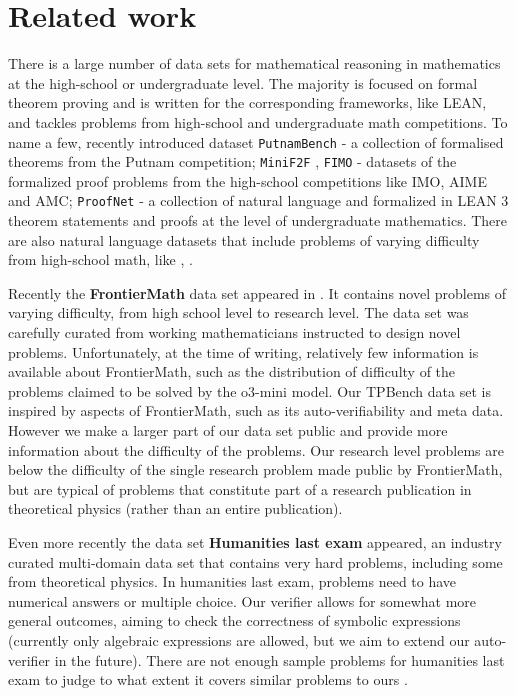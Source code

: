 \section{Related work}
\label{sec:relatedwork}

\iffalse
There is a large number of data sets for mathematical reasoning in mathematics at the high-school or undergraduate level. The majority is focused on formal theorem proving and is written for the corresponding frameworks, like LEAN, and tackles problems from high-school and undergraduate math competitions. To name a few, recently introduced dataset \texttt{PutnamBench} \cite{tsoukalas2024putnambenchevaluatingneuraltheoremprovers} - a collection of formalised theorems from the Putnam competition; \texttt{MiniF2F} \cite{zheng2022minif2fcrosssystembenchmarkformal}, \texttt{FIMO} \cite{liu2023fimochallengeformaldataset} - datasets of the formalized proof problems from the high-school competitions like IMO, AIME and AMC; \texttt{ProofNet} \cite{azerbayev2023proofnetautoformalizingformallyproving} - a collection of natural language and formalized in LEAN 3 theorem statements and proofs at the level of undergraduate mathematics. There are also natural language datasets that include problems of varying difficulty from high-school math, like \cite{hendrycks2021measuringmathematicalproblemsolving}, \cite{cobbe2021trainingverifierssolvemath}.  

Recently the \textbf{FrontierMath} data set appeared in \cite{glazer2024frontiermath}. It contains novel problems of varying difficulty, from high school level to research level. The data set was carefully curated from working mathematicians instructed to design novel problems. Unfortunately, at the time of writing, relatively few information is available about FrontierMath, such as the distribution of difficulty of the problems claimed to be solved by the o3-mini model. Our TPBench data set is inspired by aspects of FrontierMath, such as its auto-verifiability and meta data. However we make a larger part of our data set public and provide more information about the difficulty of the problems. Our research level problems are below the difficulty of the single research problem made public by FrontierMath, but are typical of problems that constitute part of a research publication in theoretical physics (rather than an entire publication). 

Even more recently the data set \textbf{Humanities last exam} \cite{phan2025humanity} appeared, an industry curated multi-domain data set that contains very hard problems, including some from theoretical physics. In humanities last exam, problems need to have numerical answers or multiple choice. Our verifier allows for somewhat more general outcomes, aiming to check the correctness of symbolic expressions (currently only algebraic expressions are allowed, but we aim to extend our auto-verifier in the future). There are not enough sample problems for humanities last exam to judge to what extent it covers similar problems to ours . 

